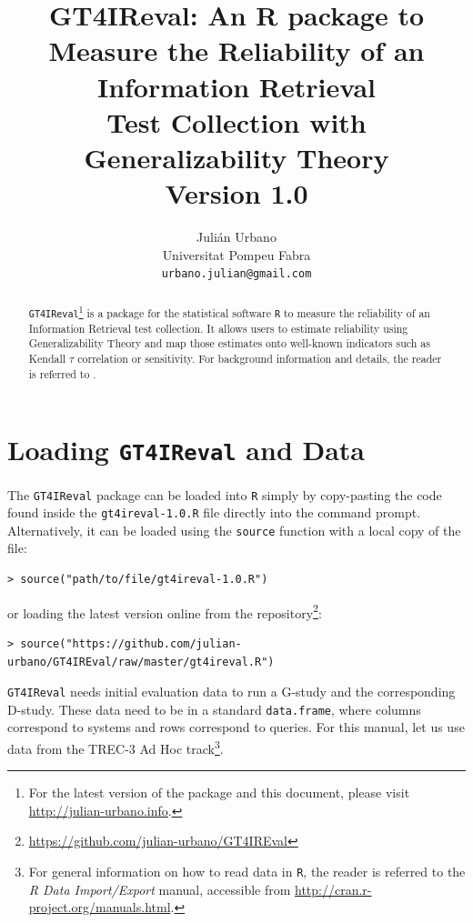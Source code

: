 \documentclass[twoside]{article}
\begin{document}
\title{\textbf{GT4IReval: An R package to Measure the Reliability of an Information Retrieval\\Test Collection with Generalizability Theory\\{\Large Version 1.0}}}
\author{Juli\'an Urbano\\Universitat Pompeu Fabra\\\texttt{urbano.julian@gmail.com}}
\maketitle

\begin{abstract}
\noindent\texttt{GT4IReval}\footnote{For the latest version of the package and this document, please visit \url{http://julian-urbano.info}.} is a package for the statistical software \texttt{R} to measure the reliability of an Information Retrieval test collection. It allows users to estimate reliability using Generalizability Theory and map those estimates onto well-known indicators such as Kendall $\tau$ correlation or sensitivity. For background information and details, the reader is referred to \cite{Urbano2013:measurement}.
\end{abstract}

\section{Loading \texttt{GT4IReval} and Data}

The \texttt{GT4IReval} package can be loaded into \texttt{R} simply by copy-pasting the code found inside the \texttt{gt4ireval-1.0.R} file directly into the command prompt. Alternatively, it can be loaded using the \texttt{source} function with a local copy of the file:
{\small\begin{verbatim}
> source("path/to/file/gt4ireval-1.0.R")
\end{verbatim}}
\noindent or loading the latest version online from the repository\footnote{\url{https://github.com/julian-urbano/GT4IREval}}:
{\small\begin{verbatim}
> source("https://github.com/julian-urbano/GT4IREval/raw/master/gt4ireval.R")
\end{verbatim}}

\texttt{GT4IReval} needs initial evaluation data to run a G-study and the corresponding D-study. These data need to be in a standard \texttt{data.frame}, where columns correspond to systems and rows correspond to queries. For this manual, let us use data from the TREC-3 Ad Hoc track\footnote{For general information on how to read data in \texttt{R}, the reader is referred to the \textsl{R Data Import/Export} manual, accessible from \url{http://cran.r-project.org/manuals.html}.}.
\end{document}
